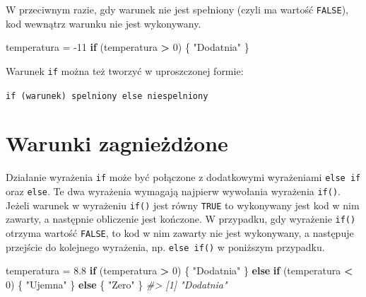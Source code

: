 \documentclass[paper=6in:9in,pagesize=pdftex,headinclude=on,footinclude=on,10pt]{scrbook}
\makeatletter
\newenvironment{Shaded}{\begin{snugshade}}{\end{snugshade}}
\newcommand{\CommentTok}[1]{\textcolor[rgb]{0.56,0.35,0.01}{\textit{#1}}}
\newcommand{\ControlFlowTok}[1]{\textcolor[rgb]{0.13,0.29,0.53}{\textbf{#1}}}
\newcommand{\DecValTok}[1]{\textcolor[rgb]{0.00,0.00,0.81}{#1}}
\newcommand{\FloatTok}[1]{\textcolor[rgb]{0.00,0.00,0.81}{#1}}
\newcommand{\NormalTok}[1]{#1}
\newcommand{\OperatorTok}[1]{\textcolor[rgb]{0.81,0.36,0.00}{\textbf{#1}}}
\newcommand{\StringTok}[1]{\textcolor[rgb]{0.31,0.60,0.02}{#1}}
\newenvironment{kframe}{%
\medskip{}
\setlength{\fboxsep}{.8em}
 \def\at@end@of@kframe{}%
 \ifinner\ifhmode%
  \def\at@end@of@kframe{\end{minipage}}%
  \begin{minipage}{\columnwidth}%
 \fi\fi%
 \def\FrameCommand##1{\hskip\@totalleftmargin \hskip-\fboxsep
 \colorbox{shadecolor}{##1}\hskip-\fboxsep
     \hskip-\linewidth \hskip-\@totalleftmargin \hskip\columnwidth}%
 \MakeFramed {\advance\hsize-\width
   \@totalleftmargin\z@ \linewidth\hsize
   \@setminipage}}%
 {\par\unskip\endMakeFramed%
 \at@end@of@kframe}
\newenvironment{rmdblock}[1]
  {
  \begin{itemize}
  \renewcommand{\labelitemi}{
    \raisebox{-.7\height}[0pt][0pt]{
      {\setkeys{Gin}{width=3em,keepaspectratio}\texttt{[image: images/\#1]}}
    }
  }
  \setlength{\fboxsep}{1em}
  \begin{kframe}
  \item
  }
  {
  \end{kframe}
  \end{itemize}
  }
\newenvironment{rmdinfo}
  {\begin{rmdblock}{compass}}
  {\end{rmdblock}}
\makeatother
\begin{document}
W przeciwnym razie, gdy warunek nie jest spełniony (czyli ma wartość \texttt{FALSE}), kod wewnątrz warunku nie jest wykonywany.

\begin{Shaded}
\begin{Highlighting}[]
\NormalTok{temperatura =}\StringTok{ }\DecValTok{-11}
\ControlFlowTok{if}\NormalTok{ (temperatura }\OperatorTok{>}\StringTok{ }\DecValTok{0}\NormalTok{) \{}
  \StringTok{"Dodatnia"}
\NormalTok{\}}
\end{Highlighting}
\end{Shaded}

\begin{rmdinfo}
\begin{rmdinfo}

Warunek \texttt{if} można też tworzyć w uproszczonej formie:

\texttt{if\ (warunek)\ spelniony\ else\ niespelniony}

\end{rmdinfo}
\end{rmdinfo}

\hypertarget{warunki-zagnieux17cdux17cone}{%
\section{Warunki zagnieżdżone}\label{warunki-zagnieux17cdux17cone}}

Działanie wyrażenia \texttt{if} może być połączone z dodatkowymi wyrażeniami \texttt{else\ if} oraz \texttt{else}.
Te dwa wyrażenia wymagają najpierw wywołania wyrażenia \texttt{if()}.
Jeżeli warunek w wyrażeniu \texttt{if()} jest równy \texttt{TRUE} to wykonywany jest kod w nim zawarty, a następnie obliczenie jest kończone.
W przypadku, gdy wyrażenie \texttt{if()} otrzyma wartość \texttt{FALSE}, to kod w nim zawarty nie jest wykonywany, a następuje przejście do kolejnego wyrażenia, np. \texttt{else\ if()} w poniższym przypadku.

\begin{Shaded}
\begin{Highlighting}[]
\NormalTok{temperatura =}\StringTok{ }\FloatTok{8.8}
\ControlFlowTok{if}\NormalTok{ (temperatura }\OperatorTok{>}\StringTok{ }\DecValTok{0}\NormalTok{) \{}
  \StringTok{"Dodatnia"}
\NormalTok{\} }\ControlFlowTok{else} \ControlFlowTok{if}\NormalTok{ (temperatura }\OperatorTok{<}\StringTok{ }\DecValTok{0}\NormalTok{) \{}
  \StringTok{"Ujemna"}
\NormalTok{\} }\ControlFlowTok{else}\NormalTok{ \{}
  \StringTok{"Zero"}
\NormalTok{\}}
\CommentTok{#> [1] "Dodatnia"}
\end{Highlighting}
\end{Shaded}
\end{document}
